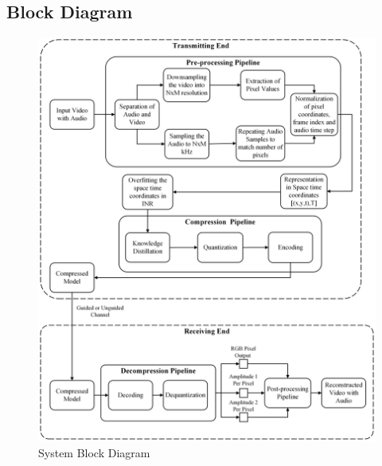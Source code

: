 \documentclass{ioereport}
\begin{document}
    \subsection{Block Diagram}
        \begin{figure}[H]
            \centering
            \includegraphics[width=\linewidth]{assets/Major Block Diagram.png}
            \caption{System Block Diagram}
            \label{fig:Block-Diagram}
        \end{figure}
        
\end{document}
